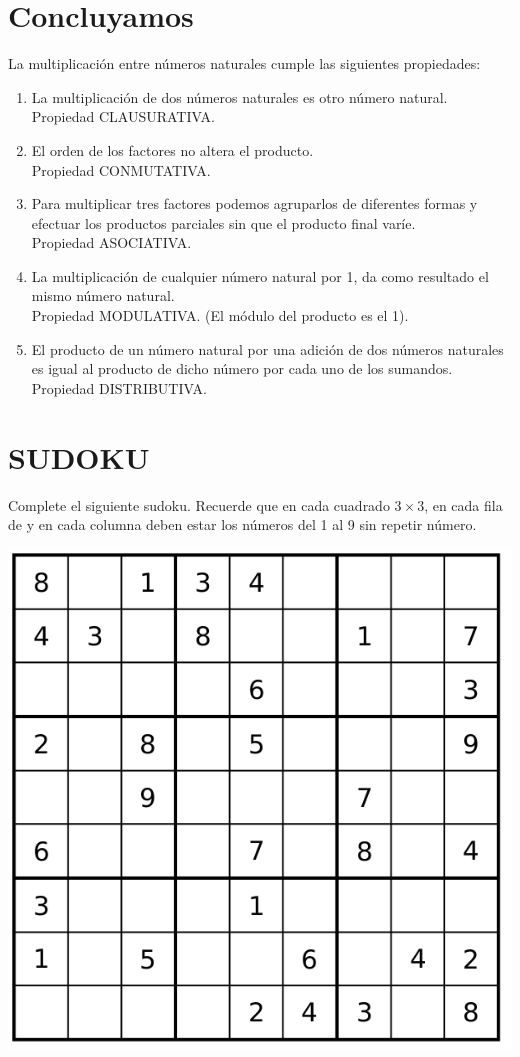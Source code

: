 \documentclass[10pt,twoside]{article}
\begin{document}
\section*{Concluyamos}
La multiplicación entre números naturales cumple las siguientes propiedades:
\begin{enumerate}
\item La multiplicación de dos números naturales es otro número natural.\\
  Propiedad CLAUSURATIVA.
\item El orden de los factores no altera el producto.\\Propiedad CONMUTATIVA.
\item Para multiplicar tres factores podemos agruparlos de diferentes formas y
  efectuar los productos parciales sin que el producto final varíe.\\Propiedad
  ASOCIATIVA.
\item La multiplicación de cualquier número natural por 1, da como resultado el
    mismo número natural.\\Propiedad MODULATIVA. (El módulo del producto
     es el 1).
\item El producto de un número natural por una adición de dos números naturales es igual al producto de dicho número por cada uno de los sumandos.\\Propiedad DISTRIBUTIVA.
\end{enumerate}
\section*{SUDOKU}
Complete el siguiente sudoku. Recuerde que en cada cuadrado $3\times 3$, en cada fila de y en cada columna deben estar los números del 1 al 9 sin repetir n\'{u}mero.
\begin{center}
\includegraphics[scale=.39]{Images/sudoku01.png} 
\end{center}
\end{document}

